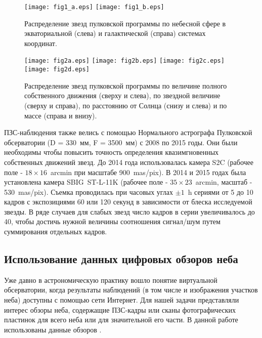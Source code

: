 \begin{figure}[h]
\centering
\texttt{[image: fig1\_a.eps]}
\texttt{[image: fig1\_b.eps]}
\caption{Распределение звезд пулковской программы по небесной сфере в экваториальной (слева) и галактической (справа) системах координат.}
 \label{fig:15alloc}
\end{figure}

\begin{figure}[h]
\centering
\texttt{[image: fig2a.eps]}
\texttt{[image: fig2b.eps]}
\texttt{[image: fig2c.eps]}
\texttt{[image: fig2d.eps]}
\caption{Распределение звезд пулковской программы по величине полного собственного движения (сверху и слева), по звездной величине (сверху и справа), по расстоянию от Солнца (снизу и слева) и по массе (справа и внизу).}
\label{fig:15hist}
\end{figure}

ПЗС-наблюдения также велись с помощью Нормального астрографа Пулковской обсерватории (D = 330~мм, F = 3500~мм) с 2008 по 2015 годы. Они были необходимы чтобы повысить точность определения квазимгновенных собственных движений звезд.  До 2014 года использовалась камера S2C (рабочее поле - $18\times16$~arcmin при масштабе 900~mas/pix). В 2014 и 2015 годах была установлена камера \mbox{SBIG ST-L-11K} (рабочее поле - $35\times23$~arcmin, масштаб - 530~mas/pix). Съемка проводилась при часовых углах $\pm1$~h сериями от 5 до 10 кадров с экспозициями 60 или 120 секунд в зависимости от блеска исследуемой звезды. В ряде случаев для слабых звезд число кадров в серии увеличивалось до 40, чтобы достичь нужной величины соотношения сигнал/шум путем суммирования отдельных кадров.
\subsection{Использование данных цифровых обзоров неба} \label{subsec:ch3/sect2/sub2}
Уже давно в астрономическую практику вошло понятие \glqq виртуальной обсерватории\grqq , когда результаты наблюдений (в том числе и изображения участков неба) доступны с помощью сети Интернет.  Для нашей задачи представляли интерес обзоры неба, содержащие ПЗС-кадры или сканы фотографических пластинок для всего неба или для значительной его части. В данной работе использованы данные обзоров .

